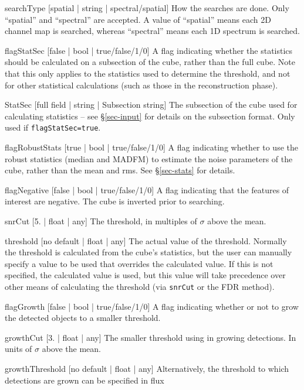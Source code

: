 \begin{Lentry}
\item[{searchType [spatial | string | spectral/spatial]}] How the
  searches are done. Only ``spatial'' and ``spectral'' are accepted. A
  value of ``spatial'' means each 2D channel map is searched, whereas
  ``spectral'' means each 1D spectrum is searched.
\item[{flagStatSec [false | bool | true/false/1/0]}] A flag indicating
  whether the statistics should be calculated on a subsection of the
  cube, rather than the full cube. Note that this only applies to the
  statistics used to determine the threshold, and not for other
  statistical calculations (such as those in the reconstruction
  phase).
\item[{StatSec [full field | string | Subsection string]}] The
  subsection of the cube used for calculating statistics -- see
  \S\ref{sec-input} for details on the subsection format. Only used if
  \texttt{flagStatSec=true}.
\item[{flagRobustStats [true | bool | true/false/1/0]}] A flag
  indicating whether to use the robust statistics (median and MADFM)
  to estimate the noise parameters of the cube, rather than the mean
  and rms. See \S\ref{sec-stats} for details.
\item[{flagNegative [false | bool | true/false/1/0]}] A flag
  indicating that the features of interest are negative. The cube is
  inverted prior to searching.
\item[{snrCut [5. | float | any]}] The threshold, in multiples of
  $\sigma$ above the mean.
\item[{threshold [no default | float | any]}] The actual value of the
  threshold. Normally the threshold is calculated from the cube's
  statistics, but the user can manually specify a value to be used
  that overrides the calculated value. If this is not specified, the
  calculated value is used, but this value will take precedence over
  other means of calculating the threshold (\ie via \texttt{snrCut} or
  the FDR method).
\item[{flagGrowth [false | bool | true/false/1/0]}] A flag indicating
  whether or not to grow the detected objects to a smaller threshold.
\item[{growthCut [3. | float | any]}] The smaller threshold using in
  growing detections. In units of $\sigma$ above the mean.
\item[{growthThreshold [no default | float | any]}] Alternatively, the
  threshold to which detections are grown can be specified in flux

\end{Lentry}
